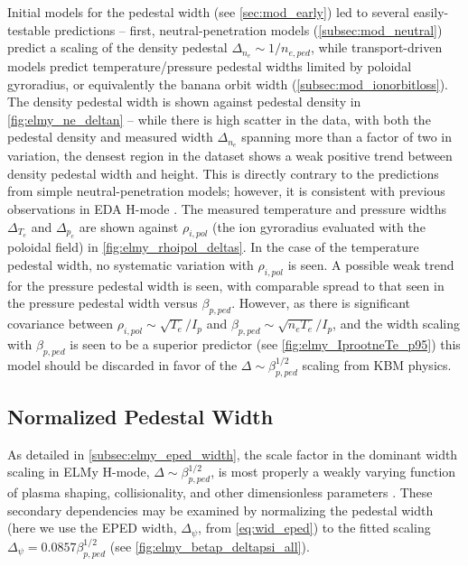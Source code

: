 Initial models for the pedestal width (see \cref{sec:mod_early}) led to several easily-testable predictions -- first, neutral-penetration models (\cref{subsec:mod_neutral}) predict a scaling of the density pedestal $\Delta_{n_e} \sim 1/n_{e,ped}$, while transport-driven models predict temperature/pressure pedestal widths limited by poloidal gyroradius, or equivalently the banana orbit width (\cref{subsec:mod_ionorbitloss}).  The density pedestal width is shown against pedestal density in \cref{fig:elmy_ne_deltan} -- while there is high scatter in the data, with both the pedestal density and measured width $\Delta_{n_e}$ spanning more than a factor of two in variation, the densest region in the dataset shows a weak positive trend between density pedestal width and height.  This is directly contrary to the predictions from simple neutral-penetration models; however, it is consistent with previous observations in EDA H-mode \cite{Hughes2002}.  The measured temperature and pressure widths $\Delta_{T_e}$ and $\Delta_{p_e}$ are shown against $\rho_{i,pol}$ (the ion gyroradius evaluated with the poloidal field) in \cref{fig:elmy_rhoipol_deltas}.  In the case of the temperature pedestal width, no systematic variation with $\rho_{i,pol}$ is seen.  A possible weak trend for the pressure pedestal width is seen, with comparable spread to that seen in the pressure pedestal width versus $\beta_{p,ped}$.  However, as there is significant covariance between $\rho_{i,pol} \sim \sqrt{T_e}/I_p$ and $\beta_{p,ped} \sim \sqrt{n_e T_e}/I_p$, and the width scaling with $\beta_{p,ped}$ is seen to be a superior predictor (see \cref{fig:elmy_IprootneTe_p95}) this model should be discarded in favor of the $\Delta \sim \beta_{p,ped}^{1/2}$ scaling from KBM physics.

\subsection{Normalized Pedestal Width}\label{subsec:elmy_normwidth}

As detailed in \cref{subsec:elmy_eped_width}, the scale factor in the dominant width scaling in ELMy H-mode, $\Delta \sim \beta_{p,ped}^{1/2}$, is most properly a weakly varying function of plasma shaping, collisionality, and other dimensionless parameters \cite{Snyder2011}.  These secondary dependencies may be examined by normalizing the pedestal width (here we use the EPED width, $\Delta_\psi$, from \cref{eq:wid_eped}) to the fitted scaling $\Delta_\psi = 0.0857 \beta_{p,ped}^{1/2}$ (see \cref{fig:elmy_betap_deltapsi_all}).  

